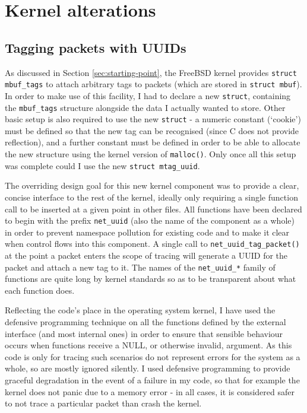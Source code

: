 \documentclass[a4paper,12pt,twoside,openright]{report}
\begin{document}
	\section{Kernel alterations}
	
	\subsection{Tagging packets with UUIDs}
	
	As discussed in Section \ref{sec:starting-point}, the FreeBSD kernel provides \verb|struct mbuf_tags| to attach arbitrary tags to packets (which are stored in \verb|struct mbuf|). In order to make use of this facility, I had to declare a new \verb|struct|, containing the \verb|mbuf_tags| structure alongside the data I actually wanted to store. Other basic setup is also required to use the new \verb|struct| - a numeric constant (`cookie') must be defined so that the new tag can be recognised (since C does not provide reflection), and a further constant must be defined in order to be able to allocate the new structure using the kernel version of \verb|malloc()|. Only once all this setup was complete could I use the new \verb|struct mtag_uuid|.
	
	The overriding design goal for this new kernel component was to provide a clear, concise interface to the rest of the kernel, ideally only requiring a single function call to be inserted at a given point in other files. All functions have been declared to begin with the prefix \verb|net_uuid| (also the name of the component as a whole) in order to prevent namespace pollution for existing code and to make it clear when control flows into this component. A single call to \verb|net_uuid_tag_packet()| at the point a packet enters the scope of tracing will generate a UUID for the packet and attach a new tag to it. The names of the \verb|net_uuid_*| family of functions are quite long by kernel standards so as to be transparent about what each function does.
	
	Reflecting the code's place in the operating system kernel, I have used the defensive programming technique on all the functions defined by the external interface (and most internal ones) in order to ensure that sensible behaviour occurs when functions receive a NULL, or otherwise invalid, argument. As this code is only for tracing such scenarios do not represent errors for the system as a whole, so are mostly ignored silently. I used defensive programming to provide graceful degradation in the event of a failure in my code, so that for example the kernel does not panic due to a memory error - in all cases, it is considered safer to not trace a particular packet than crash the kernel.
	
\end{document}
